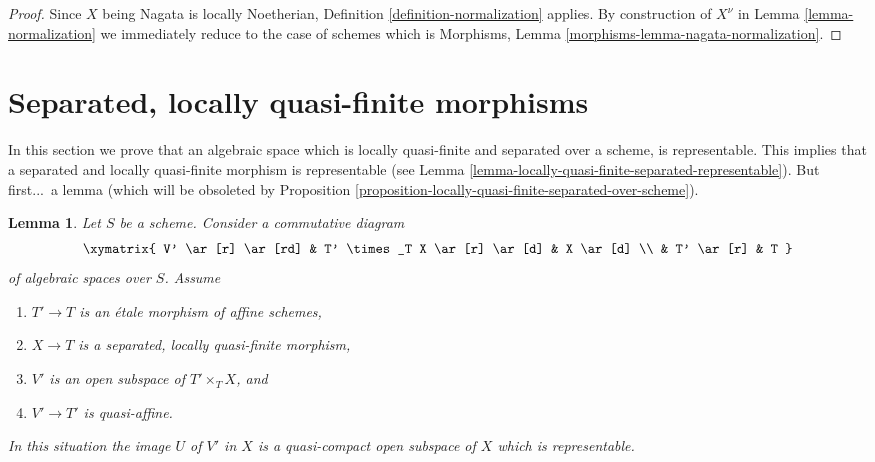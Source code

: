 \documentclass{stacks-project}
\theoremstyle{plain}
\newtheorem{lemma}[subsection]{Lemma}
\theoremstyle{definition}
\theoremstyle{remark}
\numberwithin{equation}{subsection}
\begin{document}
\begin{proof}
Since $X$ being Nagata is locally Noetherian,
Definition \ref{definition-normalization} applies.
By construction of $X^\nu$ in Lemma \ref{lemma-normalization}
we immediately reduce to the case of schemes which is
Morphisms, Lemma \ref{morphisms-lemma-nagata-normalization}.
\end{proof}












\section{Separated, locally quasi-finite morphisms}
\label{section-schemehood}

\noindent
In this section we prove that an algebraic space which is locally
quasi-finite and separated over a scheme, is representable. This
implies that a separated and locally quasi-finite morphism is
representable (see
Lemma \ref{lemma-locally-quasi-finite-separated-representable}).
But first...\ a lemma (which will be obsoleted by
Proposition \ref{proposition-locally-quasi-finite-separated-over-scheme}).

\begin{lemma}
\label{lemma-neighbourhood-scheme}
Let $S$ be a scheme. Consider a commutative diagram
$$
\xymatrix{
V' \ar[r] \ar[rd] & T' \times_T X \ar[r] \ar[d] & X \ar[d] \\
& T' \ar[r] & T
}
$$
of algebraic spaces over $S$. Assume
\begin{enumerate}
\item $T' \to T$ is an \'etale morphism of affine schemes,
\item $X \to T$ is a separated, locally quasi-finite morphism,
\item $V'$ is an open subspace of $T' \times_T X$, and
\item $V' \to T'$ is quasi-affine.
\end{enumerate}
In this situation the image $U$ of $V'$ in $X$ is a quasi-compact
open subspace of $X$ which is representable.
\end{lemma}
\end{document}
